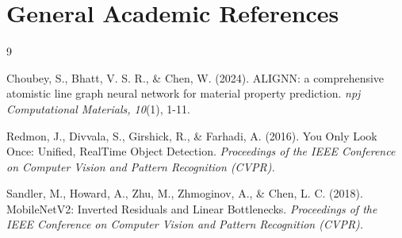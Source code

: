 \documentclass[12pt, letterpaper]{article}
\begin{document}
\section*{General Academic References}
\begin{thebibliography}{9}

Choubey, S., Bhatt, V. S. R., \& Chen, W. (2024). ALIGNN: a comprehensive atomistic line graph neural network for material property prediction. \textit{npj Computational Materials, 10}(1), 1-11.

Redmon, J., Divvala, S., Girshick, R., \& Farhadi, A. (2016). You Only Look Once: Unified, RealTime Object Detection. \textit{Proceedings of the IEEE Conference on Computer Vision and Pattern Recognition (CVPR).}

Sandler, M., Howard, A., Zhu, M., Zhmoginov, A., \& Chen, L. C. (2018). MobileNetV2: Inverted Residuals and Linear Bottlenecks. \textit{Proceedings of the IEEE Conference on Computer Vision and Pattern Recognition (CVPR).}

\end{thebibliography}

\end{document}
